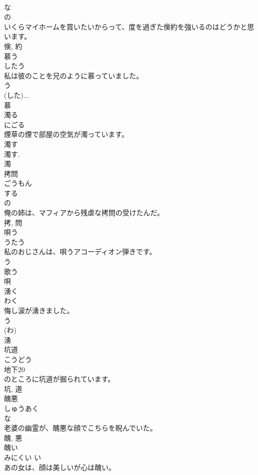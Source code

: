 \documentclass[8pt]{extreport}
\begin{document}
\begin{CJK}{UTF8}{min}
\\	な 
\\	の 
\\	いくらマイホームを買いたいからって、度を過ぎた倹約を強いるのはどうかと思います。	
\\	倹, 約	
\\	慕う	
\\	したう	
\\	私は彼のことを兄のように慕っていました。	
\\	う 
\\	(した)... 
\\	慕	
\\	濁る	
\\	にごる	
\\	煙草の煙で部屋の空気が濁っています。	
\\	濁す 
\\	濁す. 
\\	濁	
\\	拷問	
\\	ごうもん	
\\	する 
\\	の 
\\	俺の姉は、マフィアから残虐な拷問の受けたんだ。	
\\	拷, 問	
\\	唄う	
\\	うたう	
\\	私のおじさんは、唄うアコーディオン弾きです。	
\\	う 
\\	歌う 
\\	唄	
\\	湧く	
\\	わく	
\\	悔し涙が湧きました。	
\\	う 
\\	(わ) 
\\	湧	
\\	坑道	
\\	こうどう	
\\	地下20
\\	のところに坑道が掘られています。	
\\	坑, 道	
\\	醜悪	
\\	しゅうあく	
\\	な 
\\	老婆の幽霊が、醜悪な顔でこちらを睨んでいた。	
\\	醜, 悪	
\\	醜い	
\\	みにくい	い 
\\	あの女は、顔は美しいが心は醜い。	

\end{CJK}
\end{document}
